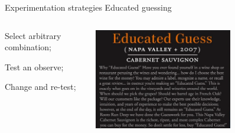 \documentclass[t]{beamer}
\begin{document}
\begin{ftst}
{Experimentation strategies}
{Educated guessing}
\vspace{-1em}
\begin{columns}[T]
	\begin{block}{}
		\bitems Select arbitrary combination;
			\item Test an observe; 
			\item Change and re-test;
		\eitem
	\end{block}
	\vone
	\centering\includegraphics[width=0.65\textwidth]{../figs/edguess3.png}
\vhalf

\end{columns}
\end{ftst}
\end{document}

